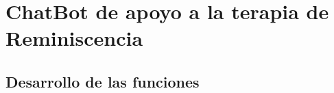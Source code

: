 \chapter{ChatBot de apoyo a la terapia de Reminiscencia}
\label{cap:ChatBot de apoyo a la terapia de Reminiscencia}
\section{Desarrollo de las funciones}
